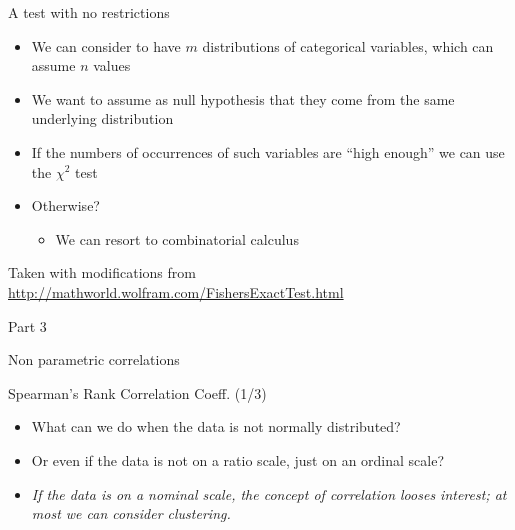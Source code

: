 \documentclass{beamer}
\begin{document}
\begin{frame}
{\centerline{A test with no restrictions}}

\begin{itemize}
    \item We can consider to have $m$ distributions of categorical variables, which can assume $n$ values 
    \item We want to assume as null hypothesis that they come from the same underlying distribution
    \item If the numbers of occurrences of such variables are ``high enough'' we can use the $\chi^2$ test
    \item Otherwise?
    \begin{itemize}
    \item We can resort to combinatorial calculus
\end{itemize}
\end{itemize}

\begin{center}
\tiny{Taken with modifications from \url{http://mathworld.wolfram.com/FishersExactTest.html}}
\end{center}
\end{frame}




\begin{frame}
{\centerline{Part 3}}

\begin{center}
\Huge Non parametric correlations
\end{center}
\end{frame}

\begin{frame}
{\centerline{Spearman's Rank Correlation Coeff. (1/3)}}

\begin{itemize}
   \item What can we do when the data is not normally distributed?
   \item Or even if the data is not on a ratio scale, just on an ordinal scale?\newline
   \item \textit{If the data is on a nominal scale, the concept of correlation looses interest; at most we can consider clustering.}
\end{itemize}


\end{frame}
\end{document}
